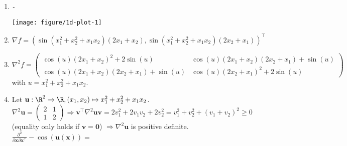\begin{enumerate}
	\item 	
\begin{knitrout}
\color{fgcolor}\begin{kframe}
\begin{alltt}

 \hlkwb{<-} \hlstd{(}\hlstd{,} \hlstd{)} - \hlopt{^} \hlopt{+} \hlopt{^} \hlopt{+} \hlopt{*}
 \hlkwb{=} \hlstd{(}\hlopt{-}\hlstd{,} \hlstd{,} \hlstd{=}\hlstd{)}
 \hlkwb{=} \hlstd{(}   

 \hlkwb{=} \hlstd{(xx[, }\hlstd{], xx[, }\hlstd{])}
 \hlkwb{=} \hlstd{(}     

 \hlstd{(}      \hlopt{+}
  \hlstd{()} \hlopt{+}
  \hlstd{(}\hlstd{)} \hlopt{+}
  \hlstd{(}\hlstd{)}
\end{alltt}
\end{kframe}
\texttt{[image: figure/1d-plot-1]} 
\end{knitrout}
\item $\nabla f = (\sin(x_1^2 + x_2^2 + x_1x_2)(2x_1 + x_2), \sin(x_1^2 + x_2^2 + x_1x_2)(2x_2 + x_1))^\top$
\item $\nabla^2 f = \begin{pmatrix} \cos(u)(2x_1 + x_2)^2 + 2\sin(u) & \cos(u)(2x_1 + x_2)(2x_2 + x_1) + \sin(u) \\ 
 \cos(u)(2x_1 + x_2)(2x_2 + x_1) + \sin(u) & \cos(u)(2x_2 + x_1)^2 + 2\sin(u)\end{pmatrix}$ with $u = x_1^2 + x_2^2 + x_1x_2.$
 \item Let $\mathbf{u}: \R^2 \rightarrow \R, (x_1, x_2) \mapsto x_1^2 + x_2^2 + x_1x_2$. \\ %
 $\nabla^2 \mathbf{u} = \begin{pmatrix} 2 & 1 \\ 1 & 2\end{pmatrix} \Rightarrow \mathbf{v}^\top \nabla^2 \mathbf{u} \mathbf{v} = 2 v_1^2 + 2v_1v_2 + 2 v_2^2 = v_1^2 + v_2^2 + (v_1 + v_2)^2 \geq 0$ (equality only holds if $\mathbf{v} = \mathbf{0}$) $\Rightarrow \nabla^2 \mathbf{u}$ is positive definite. \\
 $    \frac{\partial^2}{\partial \mathbf{x} \partial \mathbf{x}^\top}-\cos(\mathbf{u}(\mathbf{x})) =$
	
\end{enumerate}
